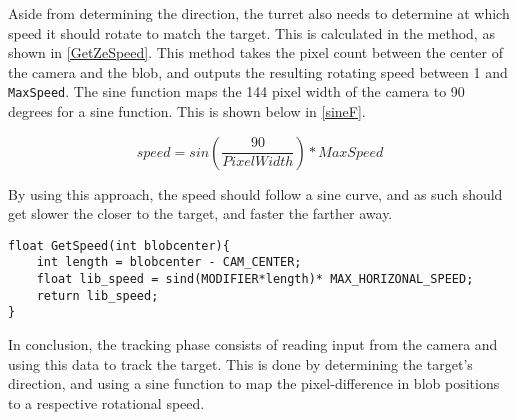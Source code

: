 Aside from determining the direction, the turret also needs to determine at
which speed it should rotate to match the target. This is calculated in the
 method, as shown in \autoref{GetZeSpeed}. This method
takes the pixel count between the center of the camera and the blob, and outputs
the resulting rotating speed between 1 and \texttt{MaxSpeed}. The sine function
maps the 144 pixel width of the camera to 90 degrees for a sine function. This is shown below in
\autoref{sineF}.

\begin{equation}\label{sineF}
speed = sin(\frac{90}{PixelWidth})*MaxSpeed
\end{equation} 

By using this approach, the speed should follow a sine curve, and as such
should get slower the closer to the target, and faster the farther away.\nl

\begin{minipage}[H]{\linewidth}
\begin{lstlisting}[caption = Determine speed to rotate using a sine function, label = GetZeSpeed] 
float GetSpeed(int blobcenter){
    int length = blobcenter - CAM_CENTER;
    float lib_speed = sind(MODIFIER*length)* MAX_HORIZONAL_SPEED;
    return lib_speed;
}
\end{lstlisting}
\end{minipage}

In conclusion, the tracking phase consists of reading input from the camera and
using this data to track the target. This is done by determining the target's
direction, and using a sine function to map the pixel-difference in blob
positions to a respective rotational speed.